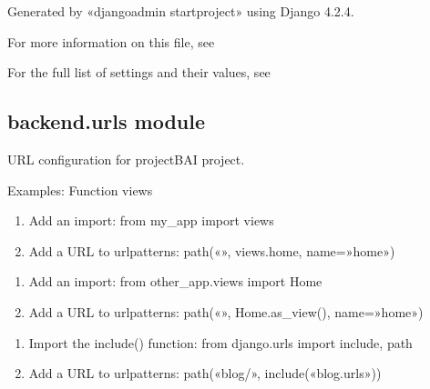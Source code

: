 \documentclass[letterpaper,10pt,polish]{sphinxmanual}
\begin{document}
\sphinxAtStartPar
Generated by «django\sphinxhyphen{}admin startproject» using Django 4.2.4.

\sphinxAtStartPar
For more information on this file, see

\sphinxAtStartPar
For the full list of settings and their values, see


\subsection{backend.urls module}
\label{\detokenize{backend:module-backend.urls}}\label{\detokenize{backend:backend-urls-module}}
\sphinxAtStartPar
URL configuration for projectBAI project.
\begin{description}
\sphinxAtStartPar
{}

\end{description}

\sphinxAtStartPar
Examples:
Function views
\begin{enumerate}
%
\item {} 
\sphinxAtStartPar
Add an import:  from my\_app import views

\item {} 
\sphinxAtStartPar
Add a URL to urlpatterns:  path(«», views.home, name=»home»)

\end{enumerate}
\begin{description}
\begin{enumerate}
%
\item {} 
\sphinxAtStartPar
Add an import:  from other\_app.views import Home

\item {} 
\sphinxAtStartPar
Add a URL to urlpatterns:  path(«», Home.as\_view(), name=»home»)

\end{enumerate}

\begin{enumerate}
%
\item {} 
\sphinxAtStartPar
Import the include() function: from django.urls import include, path

\item {} 
\sphinxAtStartPar
Add a URL to urlpatterns:  path(«blog/», include(«blog.urls»))

\end{enumerate}

\end{description}
\end{document}
